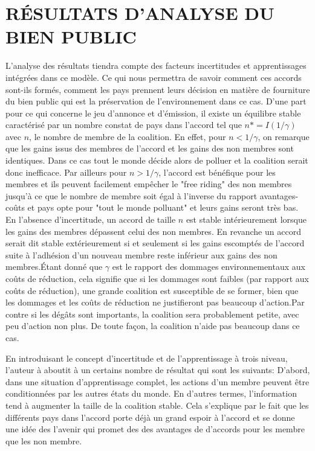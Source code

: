 \documentclass[12pt]{article}
\begin{document}
\section{RÉSULTATS D'ANALYSE DU BIEN PUBLIC}
\par L'analyse des résultats tiendra compte des facteurs incertitudes et apprentissages intégrées dans ce modèle. Ce qui nous permettra de savoir comment ces accords sont-ils formés, comment les pays prennent leurs décision en matière de fourniture du bien public qui est la préservation de l'environnement dans ce cas.
D'une part pour ce qui concerne le jeu d'annonce et d'émission, il existe un équilibre stable caractérisé par un nombre constat de pays dans l'accord tel que $n*=I(1/\gamma)$ avec $n$, le nombre de membre de la coalition. En effet, pour $n<1/\gamma$, on remarque que les gains issus des membres de l'accord et les gains des non membres sont identiques. Dans ce cas tout le monde décide alors de polluer et la coalition serait donc inefficace. Par ailleurs pour $n>1/\gamma$, l'accord est bénéfique pour les membres et ils peuvent facilement empêcher le "free riding" des non membres jusqu'à ce que le nombre de membre soit égal à l'inverse du rapport avantages-coûts et pays opte pour "tout le monde polluant" et leurs gains seront très bas. En l'absence d'incertitude, un accord de taille $n$ est stable intérieurement lorsque les gains des membres dépassent celui des non membres. En revanche un accord serait dit stable extérieurement si et seulement si les gains escomptés de l'accord suite à l'adhésion d'un nouveau membre reste inférieur aux gains des non membres.Étant donné que $\gamma$ est le rapport des dommages environnementaux aux coûts de réduction, cela signifie que si les dommages sont faibles (par rapport aux coûts de réduction), une grande coalition est susceptible de se former, bien que les dommages et les coûts de réduction ne justifieront pas beaucoup d'action.Par contre si les dégâts sont importants, la coalition sera probablement petite, avec peu d'action non plus. De toute façon, la coalition n'aide pas beaucoup dans ce cas.
\par En introduisant le concept d'incertitude et de l'apprentissage à trois niveau, l'auteur à aboutit à un certains nombre de résultat qui sont les suivants:
\newline D'abord, dans une situation d'apprentissage complet, les actions d'un membre peuvent être conditionnées par les autres états du monde. En d'autres termes, l'information tend à augmenter la taille de la coalition stable. Cela s'explique par le fait que les différents pays dans l'accord porte déjà un grand espoir à l'accord et se donne une idée des l'avenir qui promet des des avantages de d'accords pour les membre que les non membre.
\end{document}

